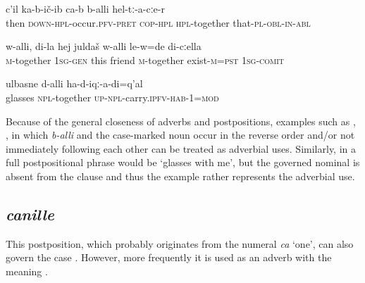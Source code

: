 \begin{exe}
	\ex
	\begin{xlist}
		\ex	\label{Then the ran together with them}
		\gll	c'il	ka-b-ič-ib	ca-b	b-alli	hel-tː-a-cːe-r   \\
			then	\textsc{down-hpl}-occur.\textsc{pfv}-\textsc{pret}	\textsc{cop-hpl}	\textsc{hpl}-together	that-\textsc{pl}-\textsc{obl}-\textsc{in}-\textsc{abl}\\
		\glt	{}

		\ex	\label{Myfriend was together with me}
		\gll	w-alli,	di-la	hej	juldaš	w-alli	le-w=de	di-cːella\\
			\textsc{m}-together	1\textsc{sg}-\textsc{gen}	this	friend	\textsc{m}-together	exist-\textsc{m}=\textsc{pst}	1\textsc{sg}-\textsc{comit}\\
		\glt	{}

		\ex	\label{If I had known that I will look at picture}
		\gll	ulbasne	d-alli	ha-d-iqː-a-di=q'al\\
			glasses	\textsc{npl}-together	\textsc{up}-\textsc{npl}-carry.\textsc{ipfv}-\textsc{hab}-1=\textsc{mod}\\
		\glt	{}
	\end{xlist}
\end{exe}

Because of the general closeness of adverbs and postpositions, examples such as , , in which \textit{b-alli} and the case-marked noun occur in the reverse order and/or not immediately following each other can be treated as adverbial uses. Similarly, in  a full postpositional phrase would be `glasses with me', but the governed nominal is absent from the clause and thus the example rather represents the adverbial use.

\subsection{\textit{canille} }
\label{ssec:postposition canille}

This postposition, which probably originates from the numeral \textit{ca} `one', can also govern the  case . However, more frequently it is used as an adverb with the meaning  .

